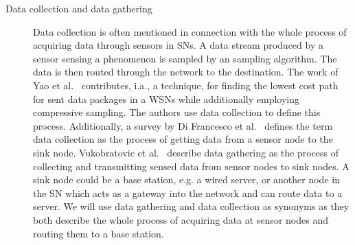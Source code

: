 \begin{description}
    \item[Data collection and data gathering] 
        Data collection is often mentioned in connection with the whole process
        of acquiring data through sensors in \acp{SN}. A data stream produced
        by a sensor sensing a phenomenon is sampled by an sampling algorithm.
        The data is then routed through the network to the destination. The
        work of Yao et al.~\cite{yao2015edal} contributes, i.a., a technique,
        for finding the lowest cost path for sent data packages in a \acp{WSN}
        while additionally employing compressive sampling. The authors use data
        collection to define this process. Additionally, a survey by Di
        Francesco et al.~\cite{di2011data} defines the term data collection as
        the process of getting data from a sensor node to the sink node.
        Vukobratovic et al.~\cite{vukobratovic2010rateless, zhang2016data}
        describe data gathering as the process of collecting and transmitting
        sensed data from sensor nodes to sink nodes. A sink node could be a
        base station, e.g. a wired server, or another node in the \ac{SN} which
        acts as a gateway into the network and can route data to a server. We
        will use data gathering and data collection as synonyms as they both
        describe the whole process of acquiring data at sensor nodes and
        routing them to a base station.


\end{description}
